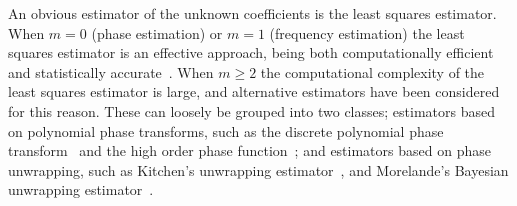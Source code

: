 \documentclass[aap]{imsart}
\begin{document}
%

An obvious estimator of the unknown coefficients is the least squares estimator.  
When $m=0$ (phase estimation) or $m=1$ (frequency estimation) the least squares estimator is an effective approach, being both computationally efficient and statistically accurate~\cite{Hannan1973,Quinn2001,McKilliam_mean_dir_est_sq_arc_length2010}. When $m \geq 2$ the computational complexity of the least squares estimator is large, and alternative estimators have been considered for this reason. These can loosely be grouped into two classes; estimators based on polynomial phase transforms, such as the discrete polynomial phase transform~\cite{Peleg_DPT_1995} and the high order phase function~\cite{Farquharson_another_poly_est_2005,Porat_asympt_HAF_DPT_1996}; and estimators based on phase unwrapping, such as Kitchen's unwrapping estimator~\cite{Kitchen_polyphase_unwrapping_1994}, and Morelande's Bayesian unwrapping estimator~\cite{Morelande_bayes_unwrapping_2009_tsp}.
\end{document}
